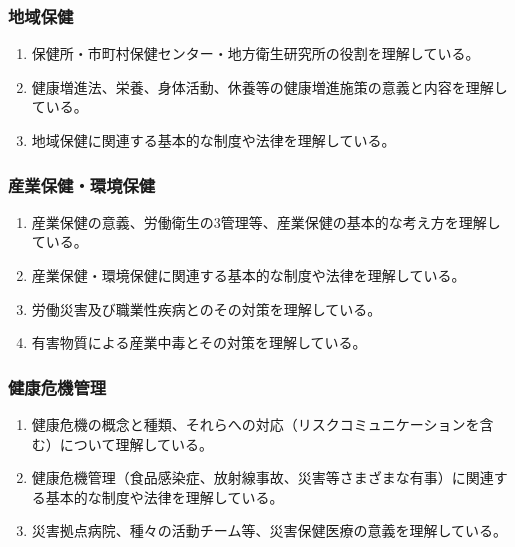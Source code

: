 \hypertarget{ux5730ux57dfux4fddux5065}{%
\subsubsection{地域保健}\label{ux5730ux57dfux4fddux5065}}

\begin{enumerate}
\def\labelenumi{\arabic{enumi}.}
\tightlist
\item
  保健所・市町村保健センター・地方衛生研究所の役割を理解している。
\item
  健康増進法、栄養、身体活動、休養等の健康増進施策の意義と内容を理解している。
\item
  地域保健に関連する基本的な制度や法律を理解している。
\end{enumerate}

\hypertarget{ux7523ux696dux4fddux5065ux74b0ux5883ux4fddux5065}{%
\subsubsection{産業保健・環境保健}\label{ux7523ux696dux4fddux5065ux74b0ux5883ux4fddux5065}}

\begin{enumerate}
\def\labelenumi{\arabic{enumi}.}
\tightlist
\item
  産業保健の意義、労働衛生の3管理等、産業保健の基本的な考え方を理解している。
\item
  産業保健・環境保健に関連する基本的な制度や法律を理解している。
\item
  労働災害及び職業性疾病とのその対策を理解している。
\item
  有害物質による産業中毒とその対策を理解している。
\end{enumerate}

\hypertarget{ux5065ux5eb7ux5371ux6a5fux7ba1ux7406}{%
\subsubsection{健康危機管理}\label{ux5065ux5eb7ux5371ux6a5fux7ba1ux7406}}

\begin{enumerate}
\def\labelenumi{\arabic{enumi}.}
\tightlist
\item
  健康危機の概念と種類、それらへの対応（リスクコミュニケーションを含む）について理解している。
\item
  健康危機管理（食品感染症、放射線事故、災害等さまざまな有事）に関連する基本的な制度や法律を理解している。
\item
  災害拠点病院、種々の活動チーム等、災害保健医療の意義を理解している。
\end{enumerate}

